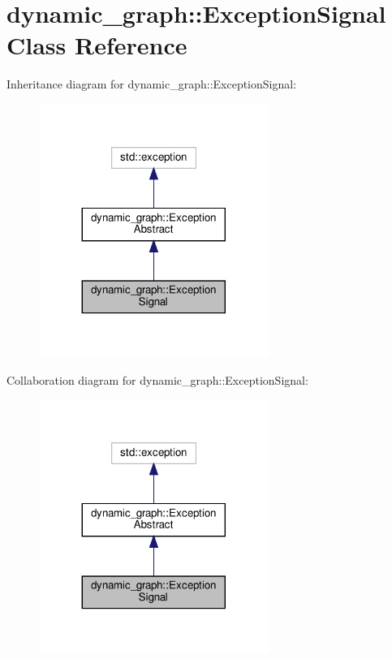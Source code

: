 \hypertarget{classdynamic__graph_1_1ExceptionSignal}{}\section{dynamic\+\_\+graph\+:\+:Exception\+Signal Class Reference}
\label{classdynamic__graph_1_1ExceptionSignal}


Inheritance diagram for dynamic\+\_\+graph\+:\+:Exception\+Signal\+:
\nopagebreak
\begin{figure}[H]
\begin{center}
\leavevmode
\includegraphics[width=212pt]{classdynamic__graph_1_1ExceptionSignal__inherit__graph}
\end{center}
\end{figure}


Collaboration diagram for dynamic\+\_\+graph\+:\+:Exception\+Signal\+:
\nopagebreak
\begin{figure}[H]
\begin{center}
\leavevmode
\includegraphics[width=212pt]{classdynamic__graph_1_1ExceptionSignal__coll__graph}
\end{center}
\end{figure}
